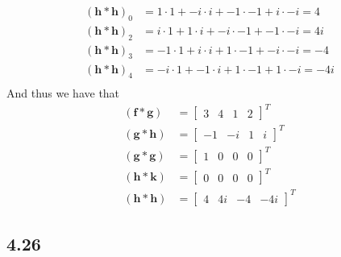 \documentclass[letterpaper,12pt]{article}
\theoremstyle{definition}
\begin{document}
\begin{align*}
(\textbf{h} \ast \textbf{h})_0  &=  1 \cdot 1 + -i \cdot i + -1 \cdot -1 + i \cdot -i = 4 \\
(\textbf{h} \ast \textbf{h})_2  &=  i \cdot 1 + 1 \cdot i + -i \cdot -1 + -1 \cdot -i = 4i \\
(\textbf{h} \ast \textbf{h})_3  &=  -1 \cdot 1 + i \cdot i + 1 \cdot -1 + -i \cdot -i = -4 \\
(\textbf{h} \ast \textbf{h})_4  &=  -i \cdot 1 + -1 \cdot i + 1 \cdot -1 + 1 \cdot -i = -4i \\
\end{align*}
And thus we have that
\begin{align*}
(\textbf{f} \ast \textbf{g}) &= \begin{bmatrix} 3 & 4 & 1 & 2 \end{bmatrix}^T\\
(\textbf{g} \ast \textbf{h}) &= \begin{bmatrix} -1 & -i & 1 & i \end{bmatrix}^T\\
(\textbf{g} \ast \textbf{g}) &= \begin{bmatrix} 1 & 0 & 0 & 0 \end{bmatrix}^T\\
(\textbf{h} \ast \textbf{k}) &= \begin{bmatrix} 0 & 0 & 0 & 0 \end{bmatrix}^T\\
(\textbf{h} \ast \textbf{h}) &= \begin{bmatrix} 4 & 4i & -4 & -4i \end{bmatrix}^T
\end{align*}








\subsection*{4.26}
\end{document}
